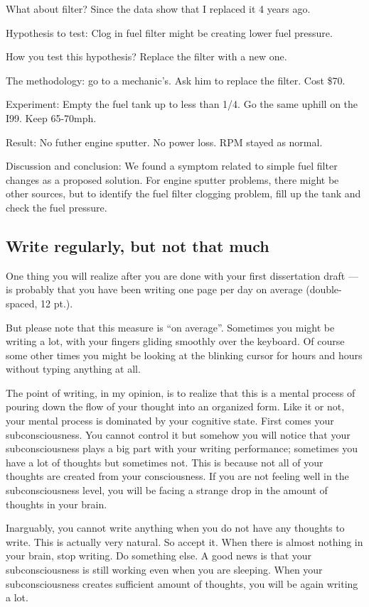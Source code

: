 \documentclass[11pt]{article}
\begin{document}
What about filter? Since the data show that I replaced it 4 years ago.

Hypothesis to test: Clog in fuel filter might be creating lower fuel pressure.

How you test this hypothesis? Replace the filter with a new one.

The methodology: go to a mechanic's. Ask him to replace the filter. Cost \$70.

Experiment: Empty the fuel tank up to less than 1/4. Go the same uphill on the
I99. Keep 65-70mph.

Result: No futher engine sputter. No power loss. RPM stayed as normal.

Discussion and conclusion: We found a symptom related to simple fuel filter
changes as a proposed solution. For engine sputter problems, there might be
other sources, but to identify the fuel filter clogging problem, fill up the
tank and check the fuel pressure.



\subsection{Write regularly, but not that much}
One thing you will realize after you are done with your first dissertation
draft --- is probably that you have been writing one page per day on average
(double-spaced, 12 pt.).

But please note that this measure is ``on average''. Sometimes you might be
writing a lot, with your fingers gliding smoothly over the keyboard.  Of
course some other times you might be looking at the blinking cursor for hours
and hours without typing anything at all. 

The point of writing, in my opinion, is to realize that this is a mental
process of pouring down the flow of your thought into an organized form.  Like
it or not, your mental process is dominated by your cognitive state.  First
comes your subconsciousness. You cannot control it but somehow you will notice
that your subconsciousness plays a big part with your writing performance;
sometimes you have a lot of thoughts but sometimes not.  This is because not
all of your thoughts are created from your consciousness. If you are not
feeling well in the subconsciousness level, you will be facing a strange
drop in the amount of thoughts in your brain.

Inarguably, you cannot write anything when you do not have any thoughts to
write. This is actually very natural. So accept it. When there is almost
nothing in your brain, stop writing. Do something else. A good news is that
your subconsciousness is still working even when you are sleeping. When your
subconsciousness creates sufficient amount of thoughts, you will be again
writing a lot. 
\end{document}

